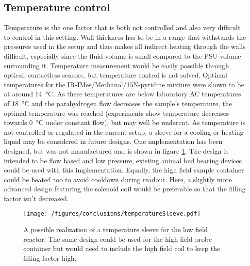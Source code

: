         \subsection{Temperature control}
            \label{cd:sabreShuttling:tempControl}
            Temperature is the one factor that is both not controlled and also very difficult to control in this setting. Wall thickness has to be in a range that withstands the pressures used in the setup and thus makes all indirect heating through the walls difficult, especially since the fluid volume is small compared to the PSU volume surrounding it. Temperature measurement would be easily possible through optical, contactless sensors, but temperature control is not solved. Optimal temperatures for the IR-IMes/Methanol/15N-pyridine mixture were shown to be at around \SI{14}{\celsius}. As these temperatures are below laboratory AC temperatures of \SI{18}{\celsius} and the parahydrogen flow decreases the sample's temperature, the optimal temperature was reached (experiments show temperature decreases towards \SI{0}{\celsius} under constant flow), but may well be undercut. As temperature is not controlled or regulated in the current setup, a sleeve for a cooling or heating liquid may be considered in future designs. One implementation has been designed, but was not manufactured and is shown in figure \ref{fig:conclusions:tempSleeve}. The design is intended to be flow based and low pressure, existing animal bed heating devices could be used with this implementation. Equally, the high field sample container could be heated too to avoid cooldown during readout. Here, a slightly more advanced design featuring the solenoid coil would be preferable so that the filling factor isn't decreased.
            \begin{figure}
                \texttt{[image: /figures/conclusions/temperatureSleeve.pdf]}
                \caption[Temperature sleeve]{A possible realization of a temperature sleeve for the low field reactor. The same design could be used for the high field probe container but would need to include the high field coil to keep the filling factor high.}
                \label{fig:conclusions:tempSleeve}
            \end{figure}
